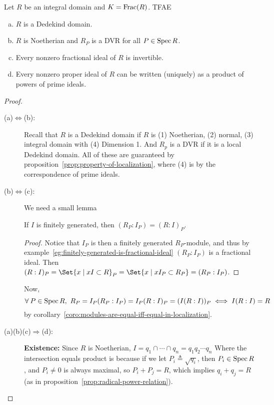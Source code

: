 \begin{theorem}
  Let $R$ be an integral domain and $K= \operatorname{Frac}(R)$. TFAE
  \begin{enumerate}[(a)]
    \item $R$ is a Dedekind domain.
    \item $R$ is Noetherian and $R_P$ is a DVR for all $P \in \operatorname{Spec} R$.
    \item Every nonzero fractional ideal of $R$ is invertible.
    \item Every nonzero proper ideal of $R$ can be written (uniquely) as a
      product of powers of prime ideals.
  \end{enumerate}

  \begin{proof} \mbox{}
    \begin{description}
      \item[\rm (a)$\Leftrightarrow$(b):]
        Recall that $R$ is a Dedekind domain if $R$ is (1) Noetherian,
        (2) normal, (3) integral domain with (4) Dimension 1.
        And $R_p$ is a DVR if it is a local Dedekind domain.
        All of these are guaranteed by proposition~\ref{prop:property-of-localization},
        where (4) is by the correspondence of prime ideals.
      \item[\rm (b)$\Leftrightarrow$(c):] We need a small lemma
        \begin{lemma}
          If $I$ is finitely generated, then $(R_P : I_P) = (R: I)_P$.
          \begin{proof}
            Notice that $I_P$ is then a finitely generated $R_P$-module,
            and thus by example~\ref{eg:finitely-generated-is-fractional-ideal}
            $(R_P: I_P)$ is a fractional ideal.
            Then $(R: I)_P = \Set{ x \mid xI \subset R}_P
            = \Set{x \mid x I_P \subset R_P} = (R_P: I_P)$.
          \end{proof}
        \end{lemma}
        Now,
        \[ \forall P \in \Spec R, \ R_P = I_P(R_P : I_P)
          = I_P (R: I)_P = (I (R:I))_P \iff I (R:I) = R \]
        by corollary~\ref{coro:modules-are-equal-iff-equal-in-localization}.

      \item[\rm (a)(b)(c)$\Rightarrow$(d):] $ $ \\
        {\bf Existence:} Since $R$ is Noetherian,
        $I = q_1 \cap \cdots \cap q_n = q_1 q_2 \dotsm q_n$
        Where the intersection equals product is because
        if we let $P_i \triangleq \sqrt{q_i}$, then $P_i \in \operatorname{Spec} R$,
        and $P_i \ne 0$ is always maximal, so $P_i + P_j = R$,
        which implies $q_i + q_j = R$ (as in proposition~\ref{prop:radical-power-relation}).


\end{description}
\end{proof}
\end{theorem}
